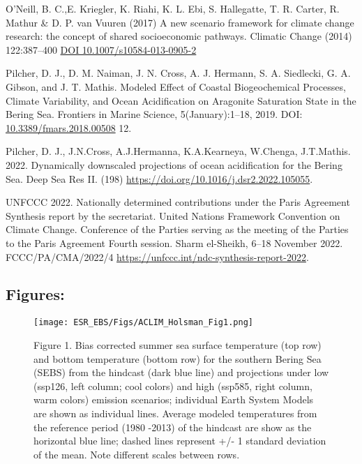 \documentclass[
]{article}
\begin{document}
O'Neill, B. C.,E. Kriegler, K. Riahi, K. L. Ebi, S. Hallegatte, T. R.
Carter, R. Mathur \& D. P. van Vuuren (2017) A new scenario framework
for climate change research: the concept of shared socioeconomic
pathways. Climatic Change (2014) 122:387--400
\href{https://link.springer.com/article/10.1007/s10584-013-0905-2}{DOI
10.1007/s10584-013-0905-2}

Pilcher, D. J., D. M. Naiman, J. N. Cross, A. J. Hermann, S. A.
Siedlecki, G. A. Gibson, and J. T. Mathis. Modeled Effect of Coastal
Biogeochemical Processes, Climate Variability, and Ocean Acidification
on Aragonite Saturation State in the Bering Sea. Frontiers in Marine
Science, 5(January):1--18, 2019. DOI:
\href{https://www.frontiersin.org/articles/10.3389/fmars.2018.00508/full}{10.3389/fmars.2018.00508}
12.

Pilcher, D. J., J.N.Cross, A.J.Hermanna, K.A.Kearneya, W.Chenga,
J.T.Mathis. 2022. Dynamically downscaled projections of ocean
acidification for the Bering Sea. Deep Sea Res II. (198)
\url{https://doi.org/10.1016/j.dsr2.2022.105055}.

UNFCCC 2022. Nationally determined contributions under the Paris
Agreement Synthesis report by the secretariat. United Nations Framework
Convention on Climate Change. Conference of the Parties serving as the
meeting of the Parties to the Paris Agreement Fourth session. Sharm
el-Sheikh, 6--18 November 2022. FCCC/PA/CMA/2022/4
\url{https://unfccc.int/ndc-synthesis-report-2022}.

\hypertarget{figures}{%
\subsection{Figures:}\label{figures}}

\begin{figure}
\centering
\texttt{[image: ESR\_EBS/Figs/ACLIM\_Holsman\_Fig1.png]}
\caption{Figure 1. Bias corrected summer sea surface temperature (top
row) and bottom temperature (bottom row) for the southern Bering Sea
(SEBS) from the hindcast (dark blue line) and projections under low
(ssp126, left column; cool colors) and high (ssp585, right column, warm
colors) emission scenarios; individual Earth System Models are shown as
individual lines. Average modeled temperatures from the reference period
(1980 -2013) of the hindcast are show as the horizontal blue line;
dashed lines represent +/- 1 standard deviation of the mean. Note
different scales between rows.}
\end{figure}
\end{document}
